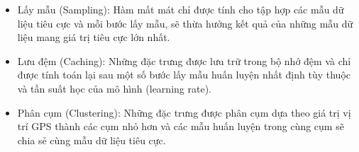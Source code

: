 \begin{itemize}
    \item Lấy mẫu (Sampling): Hàm mất mát chỉ được tính cho tập hợp các mẫu dữ liệu tiêu cực và mỗi bước lấy mẫu, sẽ thừa hưởng kết quả của những mẫu dữ liệu mang giá trị tiêu cực lớn nhất.
    \item Lưu đệm (Caching): Những đặc trưng được lưu trữ trong bộ nhớ đệm và chỉ được tính toán lại sau một số bước lấy mẫu huấn luyện nhất định tùy thuộc và tần suất học của mô hình (learning rate).
    \item Phân cụm (Clustering): Những đặc trưng được phân cụm dựa theo giá trị vị trí GPS thành các cụm nhỏ hơn và các mẫu huấn luyện trong cùng cụm sẽ chia sẻ cùng mẫu dữ liệu tiêu cực.
\end{itemize}
